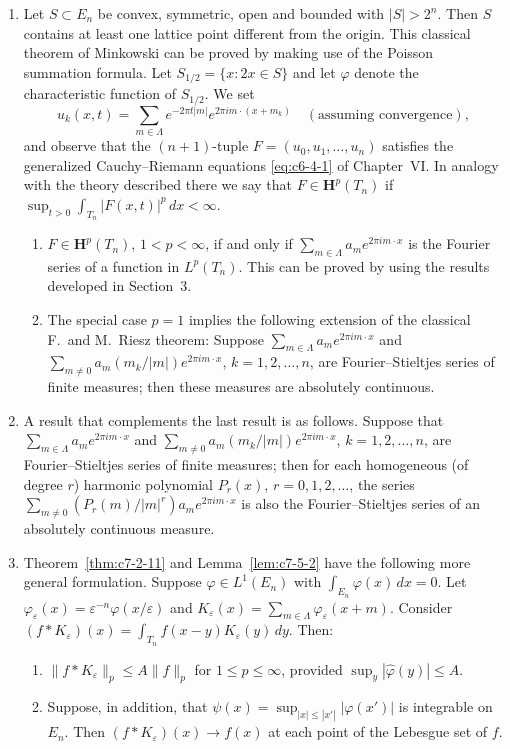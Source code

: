 \begin{enumerate}
\item[6.4.] Let $S \subset E_n$ be convex, symmetric, open and bounded with $|S| > 2^n$. Then $S$ contains at least one lattice point different from the origin. This classical theorem of Minkowski can be proved by making use of the Poisson summation formula. Let $S_{1/2} = \{x : 2x \in S\}$ and let $\varphi$ denote the characteristic function of $S_{1/2}$. We set
\[
u_k(x, t) = \sum_{m \in \Lambda} e^{-2\pi t |m|} e^{2\pi i m \cdot (x + m_k)} \quad (\text{assuming convergence}),
\]
and observe that the $(n+1)$-tuple $F = (u_0, u_1, \dots, u_n)$ satisfies the generalized Cauchy--Riemann equations \eqref{eq:c6-4-1} of Chapter~VI. In analogy with the theory described there we say that $F \in \mathbf{H}^p(T_n)$ if $\sup_{t > 0} \int_{T_n} |F(x, t)|^p\,dx < \infty$.
\begin{enumerate}
\item[(a)] $F \in \mathbf{H}^p(T_n)$, $1 < p < \infty$, if and only if $\sum_{m \in \Lambda} a_m e^{2\pi i m \cdot x}$ is the Fourier series of a function in $L^p(T_n)$. This can be proved by using the results developed in Section~3.
\item[(c)] The special case $p = 1$ implies the following extension of the classical F.~and M.~Riesz theorem: Suppose $\sum_{m \in \Lambda} a_m e^{2\pi i m \cdot x}$ and $\sum_{m \neq 0} a_m (m_k/|m|) e^{2\pi i m \cdot x}$, $k = 1, 2, \dots, n$, are Fourier--Stieltjes series of finite measures; then these measures are absolutely continuous.
\end{enumerate}

\item[6.5.] A result that complements the last result is as follows. Suppose that $\sum_{m \in \Lambda} a_m e^{2\pi i m \cdot x}$ and $\sum_{m \neq 0} a_m (m_k/|m|) e^{2\pi i m \cdot x}$, $k = 1, 2, \dots, n$, are Fourier--Stieltjes series of finite measures; then for each homogeneous (of degree $r$) harmonic polynomial $P_r(x)$, $r = 0, 1, 2, \dots$, the series $\sum_{m \neq 0} (P_r(m)/|m|^r) a_m e^{2\pi i m \cdot x}$ is also the Fourier--Stieltjes series of an absolutely continuous measure.

\item[6.6.] Theorem~\ref{thm:c7-2-11} and Lemma~\ref{lem:c7-5-2} have the following more general formulation. Suppose $\varphi \in L^1(E_n)$ with $\int_{E_n} \varphi(x)\,dx = 0$. Let $\varphi_\varepsilon(x) = \varepsilon^{-n} \varphi(x/\varepsilon)$ and $K_\varepsilon(x) = \sum_{m \in \Lambda} \varphi_\varepsilon(x + m)$. Consider $(f * K_\varepsilon)(x) = \int_{T_n} f(x - y) K_\varepsilon(y)\,dy$. Then:
\begin{enumerate}
\item[(a)] $\|f * K_\varepsilon\|_p \leq A \|f\|_p$ for $1 \leq p \leq \infty$, provided $\sup_y |\hat{\varphi}(y)| \leq A$.
\item[(b)] Suppose, in addition, that $\psi(x) = \sup_{|x| \leq |x'|} |\varphi(x')|$ is integrable on $E_n$. Then $(f * K_\varepsilon)(x) \to f(x)$ at each point of the Lebesgue set of $f$.
\end{enumerate}
\end{enumerate}

